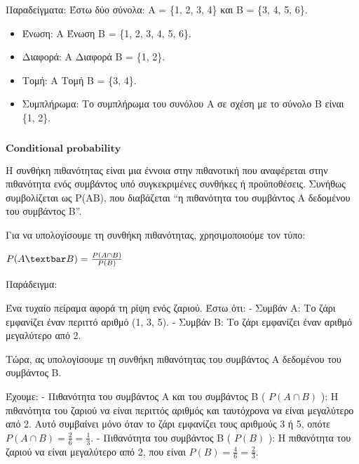 \documentclass[11pt]{article}
\makeatletter
\providecommand{\tightlist}{%
      \setlength{\itemsep}{0pt}\setlength{\parskip}{0pt}}
\newcommand{\boxspacing}{\kern\kvtcb@left@rule\kern\kvtcb@boxsep}
\newcommand{\prompt}[4]{
        {\ttfamily\llap{{\color{#2}[#3]:\hspace{3pt}#4}}\vspace{-\baselineskip}}
    }
\makeatother
\begin{document}
Παραδείγματα: Έστω δύο σύνολα: Α = \{1, 2, 3, 4\} και Β = \{3, 4, 5,
6\}.

\begin{itemize}
\tightlist
\item
  Ένωση: Α Ένωση Β = \{1, 2, 3, 4, 5, 6\}.
\item
  Διαφορά: Α Διαφορά Β = \{1, 2\}.
\item
  Τομή: Α Τομή Β = \{3, 4\}.
\item
  Συμπλήρωμα: Το συμπλήρωμα του συνόλου Α σε σχέση με το σύνολο Β είναι
  \{1, 2\}.
\end{itemize}

    \begin{tcolorbox}[breakable, size=fbox, boxrule=1pt, pad at break*=1mm,colback=cellbackground, colframe=cellborder]
\prompt{In}{incolor}{ }{\boxspacing}
\begin{Verbatim}[commandchars=\\\{\}]

\end{Verbatim}
\end{tcolorbox}

    \(\textbf{Conditional probability}\)

    Η συνθήκη πιθανότητας είναι μια έννοια στην πιθανοτική που αναφέρεται
στην πιθανότητα ενός συμβάντος υπό συγκεκριμένες συνθήκες ή
προϋποθέσεις. Συνήθως συμβολίζεται ως P(A\textbar B), που διαβάζεται ``η
πιθανότητα του συμβάντος Α δεδομένου του συμβάντος Β''.

Για να υπολογίσουμε τη συνθήκη πιθανότητας, χρησιμοποιούμε τον τύπο:

$ P(A\textbar B) = \frac{P(A \cap B)}{P(B)} $

Παράδειγμα:

Ένα τυχαίο πείραμα αφορά τη ρίψη ενός ζαριού. Έστω ότι: - Συμβάν Α: Το
ζάρι εμφανίζει έναν περιττό αριθμό (1, 3, 5). - Συμβάν Β: Το ζάρι
εμφανίζει έναν αριθμό μεγαλύτερο από 2.

Τώρα, ας υπολογίσουμε τη συνθήκη πιθανότητας του συμβάντος Α δεδομένου
του συμβάντος Β.

Έχουμε: - Πιθανότητα του συμβάντος Α και του συμβάντος Β ( $ P(A
\cap B) $ ): Η πιθανότητα του ζαριού να είναι περιττός αριθμός και
ταυτόχρονα να είναι μεγαλύτερο από 2. Αυτό συμβαίνει μόνο όταν το ζάρι
εμφανίζει τους αριθμούς 3 ή 5, οπότε $ P(A \cap B) = \frac{2}{6} =
\frac{1}{3} $. - Πιθανότητα του συμβάντος Β ( $ P(B) $ ): Η
πιθανότητα του ζαριού να είναι μεγαλύτερο από 2, που είναι $ P(B) =
\frac{4}{6} = \frac{2}{3} $.
\end{document}
